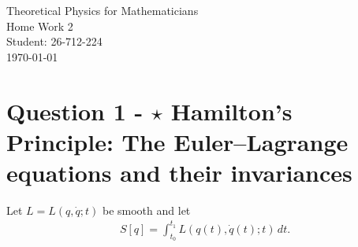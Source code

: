 \documentclass[12pt]{article}
\begin{document}
\begin{titlepage}
\centering
\vspace*{\fill} %

{\Huge Theoretical Physics for Mathematicians} \\[0.5cm] %
{\Huge Home Work 2}\\[1.5cm] %
{\Large Student: 26-712-224}\\[0.5cm] %
{\Large \today} %

\vspace*{\fill}
\end{titlepage}
\newpage
\noindent

\section*{Question 1 - \(\star\) Hamilton's Principle: The Euler--Lagrange equations and their invariances}
Let \(L=L(q,\dot q;t)\) be smooth and let
\begin{align*}
S[q]=\int_{t_0}^{t_1}L(q(t),\dot q(t);t)\,dt.
\end{align*}
\end{document}
